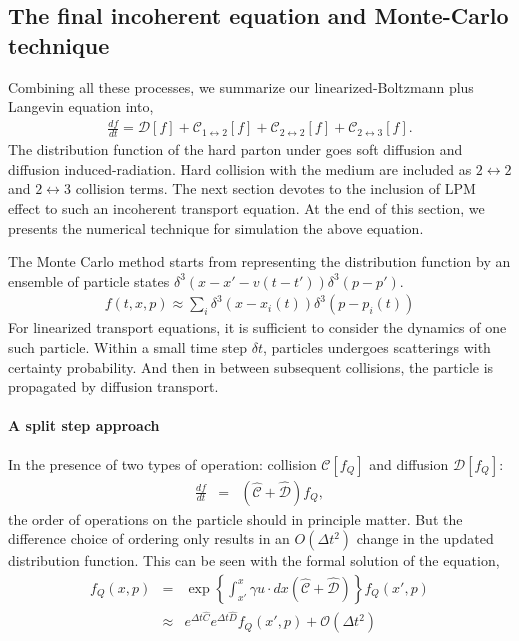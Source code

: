 \subsection{The final incoherent equation and Monte-Carlo technique}
Combining all these processes, we summarize our linearized-Boltzmann plus Langevin equation into,
\begin{eqnarray}
\frac{df}{dt} = \mathcal{D}[f] + \mathcal{C}_{1\leftrightarrow 2}[f] + \mathcal{C}_{2\leftrightarrow 2}[f] + \mathcal{C}_{2\leftrightarrow 3}[f].
\end{eqnarray}
The distribution function of the hard parton under goes soft diffusion and diffusion induced-radiation. 
Hard collision with the medium are included as $2\leftrightarrow 2$ and $2\leftrightarrow 3$ collision terms.
The next section devotes to the inclusion of LPM effect to such an incoherent transport equation.
At the end of this section, we presents the numerical technique for simulation the above equation.

The Monte Carlo method starts from representing the distribution function by an ensemble of particle states $\delta^{3}(x-x'- v(t-t')) \delta^3(p-p')$. 
\begin{eqnarray}
f(t,x,p) \approx \sum_{i} \delta^3(x-x_i(t)) \delta^3(p-p_i(t))
\end{eqnarray}
For linearized transport equations, it is sufficient to consider the dynamics of one such particle.
Within a small time step $\delta t$, particles undergoes scatterings with certainty probability.
And then in between subsequent collisions, the particle is propagated by diffusion transport.

\paragraph{A split step approach} In the presence of two types of operation: collision $\mathcal{C}[f_Q]$ and diffusion $\mathcal{D}[f_Q]$:
\begin{eqnarray}
\nonumber
  \frac{df}{dt}  &=& 
\left( \mathcal{\hat{C}} + \mathcal{\hat{D}} \right) f_Q,
\end{eqnarray}
the order of operations on the particle should in principle matter.
But the difference choice of ordering only results in an $O(\Delta t^2)$ change in the updated distribution function.
This can be seen with the formal solution of the equation,
\begin{eqnarray}
\nonumber
f_Q(x,p) &=& \exp\left\{ \int_{x'}^x \gamma u \cdot dx \left( \mathcal{\hat{C}} + \mathcal{\hat{D}} \right) \right\} f_Q(x',p)\\
&\approx & e^{\Delta t \hat{C}}e^{\Delta t \hat{D}} f_Q(x', p) + \mathcal{O}(\Delta t^2)
\end{eqnarray}


